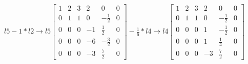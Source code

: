 \documentclass[10pt]{article}
\begin{document}
$l5-1 * l2 \rightarrow l5\left[\begin{array}{ccccc|c}1 & 2 & 3 & 2 & 0 & 0 \\ 0 & 1 & 1 & 0 & -\frac{1}{2} & 0 \\ 0 & 0 & 0 & -1 & \frac{1}{2} & 0 \\ 0 & 0 & 0 & -6 & -\frac{3}{2} & 0 \\ 0 & 0 & 0 & -3 & \frac{7}{2} & 0\end{array}\right] -\frac{1}{6} * l4 \rightarrow l4 \left[\begin{array}{ccccc|c}1 & 2 & 3 & 2 & 0 & 0 \\ 0 & 1 & 1 & 0 & -\frac{1}{2} & 0 \\ 0 & 0 & 0 & 1 & -\frac{1}{2} & 0 \\ 0 & 0 & 0 & 1 & \frac{1}{4} & 0 \\ 0 & 0 & 0 & -3 & \frac{7}{2} & 0\end{array}\right]$
\end{document}

